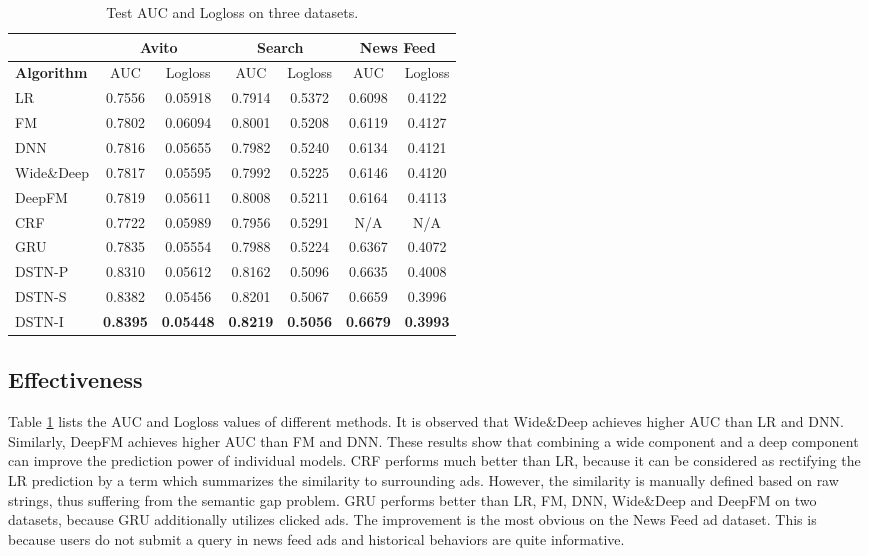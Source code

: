 \documentclass[sigconf]{acmart}
\begin{document}
\begin{table}[!t]
\setlength{\tabcolsep}{3pt}
\renewcommand{\arraystretch}{1.2}
\caption{Test AUC and Logloss on three datasets.}
\vskip -5pt
\label{tab_auc}
\centering
\begin{tabular}{|l|c|c||c|c||c|c|}
\hline
 & \multicolumn{2}{|c||}{\textbf{Avito}} & \multicolumn{2}{|c||}{\textbf{Search}}  & \multicolumn{2}{|c|}{\textbf{News Feed}} \\
\hline
\textbf{Algorithm} & AUC & Logloss & AUC & Logloss & AUC & Logloss \\
\hline
LR & 0.7556 & 0.05918 & 0.7914 & 0.5372 & 0.6098 & 0.4122 \\
\hline
FM & 0.7802 & 0.06094 & 0.8001  & 0.5208  & 0.6119 & 0.4127 \\
\hline
DNN & 0.7816 & 0.05655 & 0.7982 & 0.5240 & 0.6134 & 0.4121 \\
\hline
{\small Wide\&Deep} & 0.7817 & 0.05595 & 0.7992 & 0.5225 & 0.6146 & 0.4120 \\
\hline
DeepFM & 0.7819 & 0.05611 & 0.8008 & 0.5211 & 0.6164 & 0.4113 \\
\hline
CRF & 0.7722 & 0.05989 & 0.7956 & 0.5291 & N/A & N/A \\
\hline
GRU & 0.7835 & 0.05554 & 0.7988 & 0.5224 & 0.6367 & 0.4072 \\
\hline
DSTN-P & 0.8310 & 0.05612 & 0.8162 & 0.5096 & 0.6635 & 0.4008 \\
\hline
DSTN-S & 0.8382 & 0.05456 & 0.8201 & 0.5067 & 0.6659 & 0.3996 \\
\hline
DSTN-I & \textbf{0.8395} & \textbf{0.05448} & \textbf{0.8219} & \textbf{0.5056} & \textbf{0.6679} & \textbf{0.3993} \\
\hline
\end{tabular}
\vskip -8pt
\end{table}


\subsection{Effectiveness}
Table \ref{tab_auc} lists the AUC and Logloss values of different methods. It is observed that Wide\&Deep achieves higher AUC than LR and DNN. Similarly, DeepFM achieves higher AUC than FM and DNN. These results show that combining a wide component and a deep component can improve the prediction power of individual models.
CRF performs much better than LR, because it can be considered as rectifying the LR prediction by a term which summarizes the similarity to surrounding ads. However, the similarity is manually defined based on raw strings, thus suffering from the semantic gap problem.
GRU performs better than LR, FM, DNN, Wide\&Deep and DeepFM on two datasets, because GRU additionally utilizes clicked ads. The improvement is the most obvious on the News Feed ad dataset. This is because users do not submit a query in news feed ads and historical behaviors are quite informative.
\end{document}
